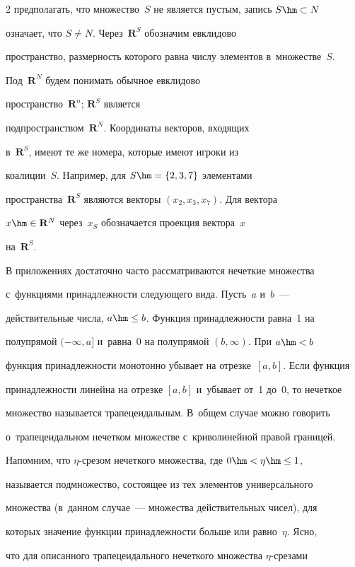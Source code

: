 \begin{multicols}{2}
предполагать, что множество~$S$ не является пус\-тым, запись $S\hm\subset N$ 

означает, что $S\not= N$. Через~$\mathbf{R}^S$ обозначим евклидово 

пространство, размерность которого равна числу элементов в~множестве~$S$. 

Под~$\mathbf{R}^N$ будем понимать обычное евклидово 

пространство~$\mathbf{R}^n$; $\mathbf{R}^S$ является 

подпространством~$\mathbf{R}^N$. Координаты векторов, входящих 

в~$\mathbf{R}^S$, имеют те же номера, которые имеют игроки из 

коалиции~$S$. Например, для $S\hm= \{2,3,7\}$ элементами 

пространства~$\mathbf{R}^S$ являются векторы $(x_2,x_3,x_7)$. Для вектора 

$x\hm\in \mathbf{R}^N$ через~$x_S$ обозначается проекция вектора~$x$ 

на~$\mathbf{R}^S$. 

    

В приложениях достаточно часто рассматриваются нечеткие множества 

с~функциями принадлежности следующего вида. Пусть~$a$ и~$b$~--- 

действительные числа, $a\hm\leq b$. Функция принадлежности равна~1 на 

полупрямой $(-\infty, a]$ и~равна~0 на полупрямой $(b,\infty)$. При $a\hm<b$ 

функция принадлежности монотонно убывает на отрезке~$[a,b]$. Если функция 

принадлежности линейна на отрезке $[a,b]$ и~убывает от~1 до~0, то нечеткое 

множество называется трапецеидальным. В~общем случае можно говорить 

о~трапецеидальном нечетком множестве с~криволинейной правой границей. 

Напомним, что $\eta$-сре\-зом нечеткого множества, где $0\hm <\eta \hm \leq 1$, 

называется подмножество, состоящее из тех элементов универсального 

множества (в~данном случае~--- множества действительных чисел), для 

которых значение функции принадлежности больше или равно~$\eta$. Ясно, 

что для описанного трапецеидального нечеткого множества $\eta$-сре\-за\-ми 


\end{multicols}
